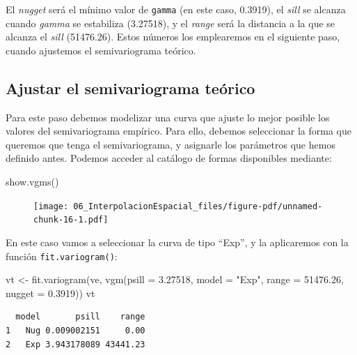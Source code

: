 \documentclass[
  letterpaper,
  DIV=11,
  numbers=noendperiod]{scrreprt}
\newenvironment{Shaded}{\begin{snugshade}}{\end{snugshade}}
\newcommand{\AttributeTok}[1]{\textcolor[rgb]{0.40,0.45,0.13}{#1}}
\newcommand{\FloatTok}[1]{\textcolor[rgb]{0.68,0.00,0.00}{#1}}
\newcommand{\FunctionTok}[1]{\textcolor[rgb]{0.28,0.35,0.67}{#1}}
\newcommand{\NormalTok}[1]{\textcolor[rgb]{0.00,0.23,0.31}{#1}}
\newcommand{\OtherTok}[1]{\textcolor[rgb]{0.00,0.23,0.31}{#1}}
\newcommand{\StringTok}[1]{\textcolor[rgb]{0.13,0.47,0.30}{#1}}
\begin{document}
El \emph{nugget} será el mínimo valor de \texttt{gamma} (en este caso,
0.3919), el \emph{sill} se alcanza cuando \emph{gamma} se estabiliza
(3.27518), y el \emph{range} será la distancia a la que se alcanza el
\emph{sill} (51476.26). Estos números los emplearemos en el siguiente
paso, cuando ajustemos el semivariograma teórico.

\hypertarget{ajustar-el-semivariograma-teuxf3rico}{%
\subsection{Ajustar el semivariograma
teórico}\label{ajustar-el-semivariograma-teuxf3rico}}

Para este paso debemos modelizar una curva que ajuste lo mejor posible
los valores del semivariograma empírico. Para ello, debemos seleccionar
la forma que queremos que tenga el semivariograma, y asignarle los
parámetros que hemos definido antes. Podemos acceder al catálogo de
formas disponibles mediante:

\begin{Shaded}
\begin{Highlighting}[]
\FunctionTok{show.vgms}\NormalTok{()}
\end{Highlighting}
\end{Shaded}

\begin{figure}[H]

{\centering \texttt{[image: 06\_InterpolacionEspacial\_files/figure-pdf/unnamed-chunk-16-1.pdf]}

}

\end{figure}

En este caso vamos a seleccionar la curva de tipo ``Exp'', y la
aplicaremos con la función \texttt{fit.variogram()}:

\begin{Shaded}
\begin{Highlighting}[]
\NormalTok{vt }\OtherTok{\textless{}{-}} \FunctionTok{fit.variogram}\NormalTok{(ve, }\FunctionTok{vgm}\NormalTok{(}\AttributeTok{psill =} \FloatTok{3.27518}\NormalTok{, }\AttributeTok{model =} \StringTok{"Exp"}\NormalTok{, }\AttributeTok{range =} \FloatTok{51476.26}\NormalTok{, }\AttributeTok{nugget =} \FloatTok{0.3919}\NormalTok{))}
\NormalTok{vt}
\end{Highlighting}
\end{Shaded}

\begin{verbatim}
  model       psill    range
1   Nug 0.009002151     0.00
2   Exp 3.943178089 43441.23
\end{verbatim}
\end{document}
